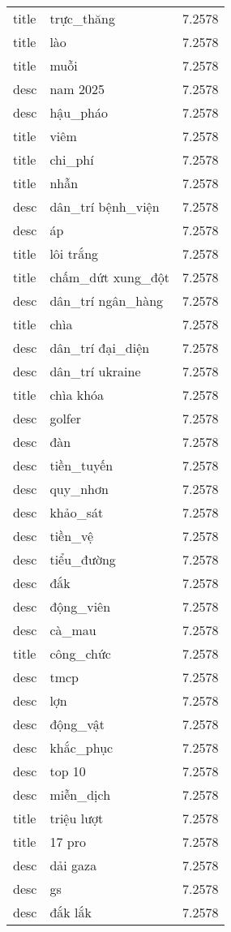 \documentclass{article}
\begin{document}
\begin{tabular}{lll}
title & trực\_thăng & 7.2578\\
title & lào & 7.2578\\
title & muỗi & 7.2578\\
desc & nam 2025 & 7.2578\\
desc & hậu\_pháo & 7.2578\\
title & viêm & 7.2578\\
title & chi\_phí & 7.2578\\
title & nhẫn & 7.2578\\
desc & dân\_trí bệnh\_viện & 7.2578\\
desc & áp & 7.2578\\
title & lôi trắng & 7.2578\\
title & chấm\_dứt xung\_đột & 7.2578\\
desc & dân\_trí ngân\_hàng & 7.2578\\
title & chìa & 7.2578\\
desc & dân\_trí đại\_diện & 7.2578\\
desc & dân\_trí ukraine & 7.2578\\
title & chìa khóa & 7.2578\\
desc & golfer & 7.2578\\
desc & đàn & 7.2578\\
desc & tiền\_tuyến & 7.2578\\
desc & quy\_nhơn & 7.2578\\
desc & khảo\_sát & 7.2578\\
desc & tiền\_vệ & 7.2578\\
desc & tiểu\_đường & 7.2578\\
desc & đắk & 7.2578\\
desc & động\_viên & 7.2578\\
desc & cà\_mau & 7.2578\\
title & công\_chức & 7.2578\\
desc & tmcp & 7.2578\\
desc & lợn & 7.2578\\
desc & động\_vật & 7.2578\\
desc & khắc\_phục & 7.2578\\
desc & top 10 & 7.2578\\
desc & miễn\_dịch & 7.2578\\
title & triệu lượt & 7.2578\\
title & 17 pro & 7.2578\\
desc & dải gaza & 7.2578\\
desc & gs & 7.2578\\
desc & đắk lắk & 7.2578\\

\end{tabular}
\end{document}
